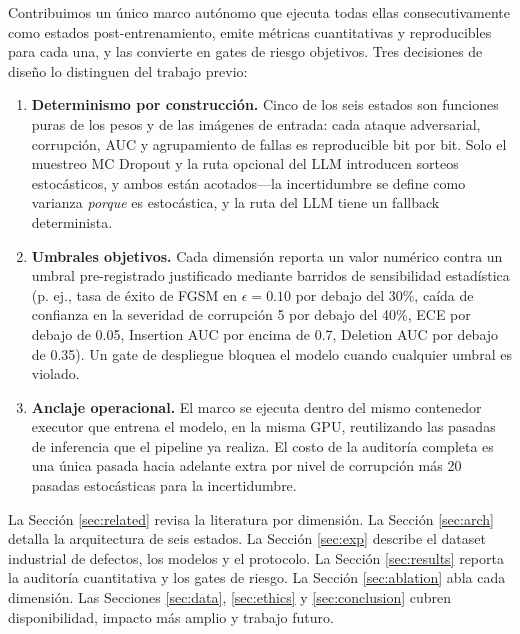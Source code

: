 \documentclass[10pt,twocolumn,letterpaper]{article}
\begin{document}
Contribuimos un único marco autónomo que ejecuta todas ellas consecutivamente como estados post-entrenamiento, emite métricas cuantitativas y reproducibles para cada una, y las convierte en gates de riesgo objetivos. Tres decisiones de diseño lo distinguen del trabajo previo:

\begin{enumerate}
    \item \textbf{Determinismo por construcción.} Cinco de los seis estados son funciones puras de los pesos y de las imágenes de entrada: cada ataque adversarial, corrupción, AUC y agrupamiento de fallas es reproducible bit por bit. Solo el muestreo MC Dropout y la ruta opcional del LLM introducen sorteos estocásticos, y ambos están acotados---la incertidumbre se define como varianza \emph{porque} es estocástica, y la ruta del LLM tiene un fallback determinista.
    \item \textbf{Umbrales objetivos.} Cada dimensión reporta un valor numérico contra un umbral pre-registrado justificado mediante barridos de sensibilidad estadística (p. ej., tasa de éxito de FGSM en $\epsilon=0.10$ por debajo del 30\%, caída de confianza en la severidad de corrupción 5 por debajo del 40\%, ECE por debajo de 0.05, Insertion AUC por encima de 0.7, Deletion AUC por debajo de 0.35). Un gate de despliegue bloquea el modelo cuando cualquier umbral es violado.
    \item \textbf{Anclaje operacional.} El marco se ejecuta dentro del mismo contenedor executor que entrena el modelo, en la misma GPU, reutilizando las pasadas de inferencia que el pipeline ya realiza. El costo de la auditoría completa es una única pasada hacia adelante extra por nivel de corrupción más 20 pasadas estocásticas para la incertidumbre.
\end{enumerate}

La Sección \ref{sec:related} revisa la literatura por dimensión. La Sección \ref{sec:arch} detalla la arquitectura de seis estados. La Sección \ref{sec:exp} describe el dataset industrial de defectos, los modelos y el protocolo. La Sección \ref{sec:results} reporta la auditoría cuantitativa y los gates de riesgo. La Sección \ref{sec:ablation} abla cada dimensión. Las Secciones \ref{sec:data}, \ref{sec:ethics} y \ref{sec:conclusion} cubren disponibilidad, impacto más amplio y trabajo futuro.
\end{document}
